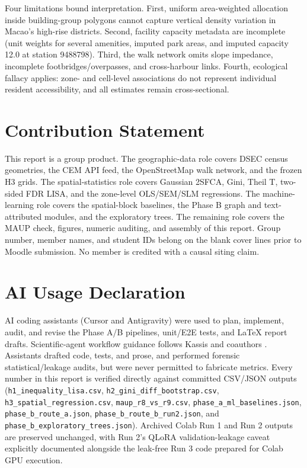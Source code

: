 \documentclass[11pt,a4paper]{article}
\begin{document}
Four limitations bound interpretation. First, uniform area-weighted allocation inside building-group polygons cannot capture vertical density variation in Macao's high-rise districts. Second, facility capacity metadata are incomplete (unit weights for several amenities, imputed park areas, and imputed capacity 12.0 at station 9488798). Third, the walk network omits slope impedance, incomplete footbridges/overpasses, and cross-harbour links. Fourth, ecological fallacy applies: zone- and cell-level associations do not represent individual resident accessibility, and all estimates remain cross-sectional.

\clearpage



\section*{Contribution Statement}
This report is a group product. The geographic-data role covers DSEC census geometries, the CEM API feed, the OpenStreetMap walk network, and the frozen H3 grids. The spatial-statistics role covers Gaussian 2SFCA, Gini, Theil T, two-sided FDR LISA, and the zone-level OLS/SEM/SLM regressions. The machine-learning role covers the spatial-block baselines, the Phase B graph and text-attributed modules, and the exploratory trees. The remaining role covers the MAUP check, figures, numeric auditing, and assembly of this report. Group number, member names, and student IDs belong on the blank cover lines prior to Moodle submission. No member is credited with a causal siting claim.

\section*{AI Usage Declaration}
{\sloppy
AI coding assistants (Cursor and Antigravity) were used to plan, implement, audit, and revise the Phase A/B pipelines, unit/E2E tests, and LaTeX report drafts. Scientific-agent workflow guidance follows Kassis and coauthors \citep{kassis2026}. Assistants drafted code, tests, and prose, and performed forensic statistical/leakage audits, but were never permitted to fabricate metrics. Every number in this report is verified directly against committed CSV/JSON outputs (\texttt{h1\_inequality\_lisa.csv}, \texttt{h2\_gini\_diff\_bootstrap.csv}, \texttt{h3\_spatial\_regression.csv}, \texttt{maup\_r8\_vs\_r9.csv}, \texttt{phase\_a\_ml\_baselines.json}, \texttt{phase\_b\_route\_a.json}, \texttt{phase\_b\_route\_b\_run2.json}, and \texttt{phase\_b\_exploratory\_trees.json}). Archived Colab Run 1 and Run 2 outputs are preserved unchanged, with Run 2's QLoRA validation-leakage caveat explicitly documented alongside the leak-free Run 3 code prepared for Colab GPU execution.\par}
\end{document}
